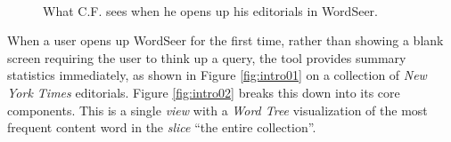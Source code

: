 \documentclass{sig-alternate}
\begin{document}
\begin{figure}[ht!]
\begin{center}
%
        \\
%
    \end{center}
    \caption{%
        What C.F. sees when he opens up his editorials in WordSeer.
     }%
\end{figure}

When a user opens up WordSeer for the first time, rather than showing a blank screen requiring the user to think up a query, the tool  provides summary statistics immediately, as shown in Figure \ref{fig:intro01} on a collection of \emph{New York Times} editorials.  Figure \ref{fig:intro02} breaks this down into its core components. This is a single \emph{view} with a \emph{Word Tree} visualization of the most frequent content word in the \emph{slice} ``the entire collection''. 
\end{document}
